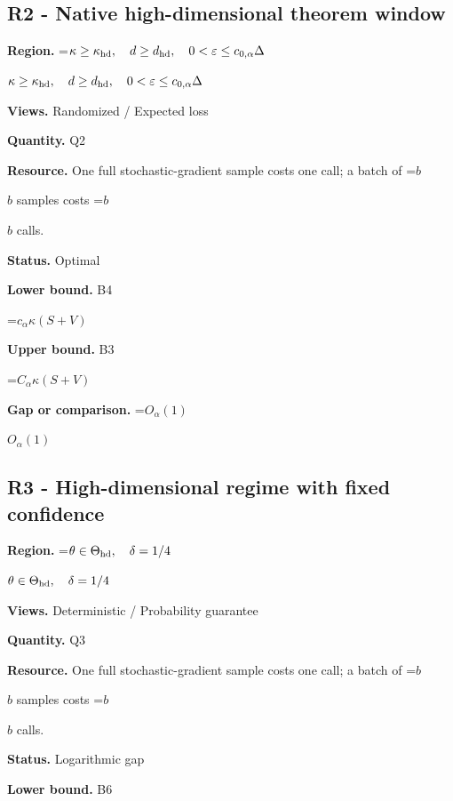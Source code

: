 \documentclass[10pt,a4paper]{article}
\newcommand{\AtlasMath}[1]{\par\begingroup\centering\setbox0=\hbox{$\displaystyle #1$}\ifdim\wd0>1.4\linewidth\typeout{ATLAS WIDE FORMULA: \the\wd0}\fi\ifdim\wd0>\linewidth\resizebox{\linewidth}{!}{\box0}\else\box0\fi\par\endgroup}
\newcommand{\AtlasInlineMath}[1]{\begingroup\setbox0=\hbox{$#1$}\ifdim\wd0>.4\linewidth\endgroup\AtlasMath{#1}\else\endgroup$#1$\fi}
\begin{document}
\subsection{R2 - Native high-dimensional theorem window}


\textbf{Region.} \AtlasInlineMath{\kappa\ge\kappa_{\rm hd},\quad d\ge d_{\rm hd},\quad0<\varepsilon\le c_{0,\alpha}\Delta}



\textbf{Views.} Randomized / Expected loss



\textbf{Quantity.} Q2



\textbf{Resource.} One full stochastic-gradient sample costs one call; a batch of \AtlasInlineMath{b} samples costs \AtlasInlineMath{b} calls.



\textbf{Status.} Optimal



\textbf{Lower bound.} B4



\AtlasMath{c_\alpha\kappa(S+V)}


\textbf{Upper bound.} B3



\AtlasMath{C_\alpha\kappa(S+V)}


\textbf{Gap or comparison.} \AtlasInlineMath{O_\alpha(1)}



\subsection{R3 - High-dimensional regime with fixed confidence}


\textbf{Region.} \AtlasInlineMath{\theta\in\Theta_{\rm hd},\quad\delta=1/4}



\textbf{Views.} Deterministic / Probability guarantee



\textbf{Quantity.} Q3



\textbf{Resource.} One full stochastic-gradient sample costs one call; a batch of \AtlasInlineMath{b} samples costs \AtlasInlineMath{b} calls.



\textbf{Status.} Logarithmic gap



\textbf{Lower bound.} B6
\end{document}
